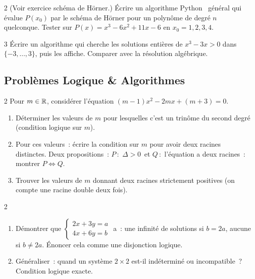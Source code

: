 \begin{bilan}
\begin{exo}{2}
(Voir exercice sch\'ema de H\"orner.)
\'Ecrire un algorithme Python \computer\ g\'en\'eral qui \'evalue $P(x_0)$
par le sch\'ema de H\"orner pour un polyn\^ome de degr\'e $n$ quelconque.
Tester sur $P(x)=x^3-6x^2+11x-6$ en $x_0=1,2,3,4$.
\end{exo}

\begin{exo}{3}
\'Ecrire un algorithme qui cherche les solutions enti\`eres de
$x^3-3x>0$ dans $\{-3,\ldots,3\}$, puis les affiche.
Comparer avec la r\'esolution alg\'ebrique.
\end{exo}

\subsection*{Probl\`emes Logique \& Algorithmes}

\begin{probleme}{2}
Pour $m\in\mathbb{R}$, consid\'erer l'\'equation $(m-1)x^2 - 2mx + (m+3)=0$.
\begin{enumerate}
  \item D\'eterminer les valeurs de $m$ pour lesquelles c'est
        un trin\^ome du second degr\'e (condition logique sur $m$).
  \item Pour ces valeurs~: \'ecrire la condition sur $m$ pour avoir
        deux racines distinctes. Deux propositions~: $P$\,:\, \og$\Delta>0$\fg\
        et $Q$\,:\, \og l'\'equation a deux racines\fg~: montrer $P\Leftrightarrow Q$.
  \item \ExtensionTTen{} Trouver les valeurs de $m$ donnant deux racines strictement positives
        (on compte une racine double deux fois).
\end{enumerate}
\end{probleme}

\begin{probleme}{2}
\begin{enumerate}
  \item D\'emontrer que $\begin{cases}2x+3y=a\\4x+6y=b\end{cases}$ a~:
        une infinit\'e de solutions si $b=2a$, aucune si $b\ne2a$.
        \'Enoncer cela comme une disjonction logique.
  \item G\'en\'eraliser~: quand un syst\`eme $2\times2$ est-il ind\'etermin\'e ou
        incompatible~? Condition logique exacte.
\end{enumerate}
\end{probleme}


\end{bilan}
